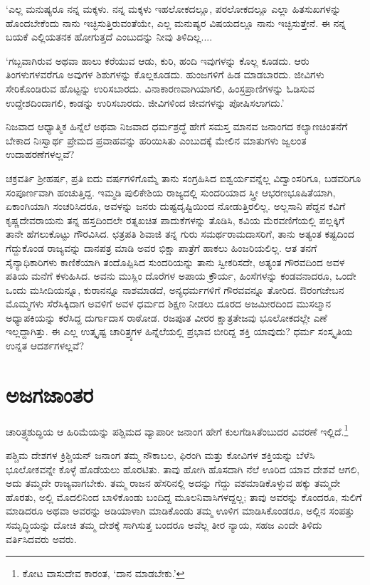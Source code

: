 \newpage

‘ಎಲ್ಲ ಮನುಷ್ಯರೂ ನನ್ನ ಮಕ್ಕಳು. ನನ್ನ ಮಕ್ಕಳು ಇಹಲೋಕದಲ್ಲೂ, ಪರಲೋಕದಲ್ಲೂ ಎಲ್ಲಾ ಹಿತಸುಖಗಳನ್ನು ಹೊಂದಬೇಕೆಂದು ನಾನು ಇಚ್ಛಿಸುತ್ತಿರುವಂತೆಯೇ, ಎಲ್ಲ ಮನುಷ್ಯರ ವಿಷಯದಲ್ಲೂ ನಾನು ಇಚ್ಛಿಸುತ್ತೇನೆ. ಈ ನನ್ನ ಬಯಕೆ ಎಲ್ಲಿಯತನಕ ಹೋಗುತ್ತದೆ ಎಂಬುದನ್ನು ನೀವು ತಿಳಿದಿಲ್ಲ....

‘ಗಬ್ಬವಾಗಿರುವ ಅಥವಾ ಹಾಲು ಕರೆಯುವ ಆಡು, ಕುರಿ, ಹಂದಿ ಇವುಗಳನ್ನು ಕೊಲ್ಲ ಕೂಡದು. ಆರು ತಿಂಗಳುಗಳವರೆಗೂ ಅವುಗಳ ಶಿಶುಗಳನ್ನು ಕೊಲ್ಲಕೂಡದು. ಹುಂಜಗಳಿಗೆ ಹಿಡ ಮಾಡಬಾರದು. ಜೀವಿಗಳು ಸೇರಿಕೊಂಡಿರುವ ಹೊಟ್ಟನ್ನು ಉರಿಸಬಾರದು. ವಿನಾಕಾರಣವಾಗಿಯಾಗಲಿ, ಹಿಂಸ್ರಪ್ರಾಣಿಗಳನ್ನು ಓಡಿಸುವ ಉದ್ದೇಶದಿಂದಾಗಲಿ, ಕಾಡನ್ನು ಉರಿಸಬಾರದು. ಜೀವಿಗಳಿಂದ ಜೀವಗಳನ್ನು ಪೋಷಿಸಲಾಗದು.’

ನಿಜವಾದ ಆಧ್ಯಾತ್ಮಿಕ ಹಿನ್ನೆಲೆ ಅಥವಾ ನಿಜವಾದ ಧರ್ಮಶ್ರದ್ಧೆ ಹೇಗೆ ಸಮಸ್ತ ಮಾನವ ಜನಾಂಗದ ಕಲ್ಯಾಣಚಿಂತನೆಗೆ ಬೇಕಾದ ನಿಃಸ್ವಾರ್ಥ ಪ್ರೇಮದ ಪ್ರವಾಹವನ್ನು ಹರಿಯಿಸಿತು ಎಂಬುದಕ್ಕೆ ಮೇಲಿನ ಮಾತುಗಳು ಜ್ವಲಂತ ಉದಾಹರಣೆಗಳಲ್ಲವೆ?

ಚಕ್ರವರ್ತಿ ಶ‍್ರೀಹರ್ಷ, ಪ್ರತಿ ಐದು ವರ್ಷಗಳಿಗೊಮ್ಮೆ ತಾನು ಸಂಗ್ರಹಿಸಿದ ಐಶ್ವರ್ಯವನ್ನೆಲ್ಲ ವಿದ್ವಾಂಸರಿಗೂ, ಬಡವರಿಗೂ ಸಂಪೂರ್ಣವಾಗಿ ಹಂಚುತ್ತಿದ್ದ. ಇಮ್ಮಡಿ ಪುಲಿಕೇಶಿಯ ರಾಜ್ಯದಲ್ಲಿ ಸುಂದರಿಯಾದ ಸ್ತ್ರೀ ಆಭರಣಭೂಷಿತೆಯಾಗಿ, ಏಕಾಂಗಿಯಾಗಿ ಸಂಚರಿಸಿದರೂ, ಅವಳನ್ನು ಜನರು ದುಷ್ಟದೃಷ್ಟಿಯಿಂದ ನೋಡುತ್ತಿರಲಿಲ್ಲ. ಅಲ್ಲಸಾನಿ ಪೆದ್ದನ ಕವಿಗೆ ಕೃಷ್ಣದೇವರಾಯನು ತನ್ನ ಹಸ್ತದಿಂದಲೇ ರತ್ನಖಚಿತ ಪಾದುಕೆಗಳನ್ನು ತೊಡಿಸಿ, ಕವಿಯ ಮೆರವಣಿಗೆಯಲ್ಲಿ ಪಲ್ಲಕ್ಕಿಗೆ ತಾನೇ ಹೆಗಲುಕೊಟ್ಟು ಗೌರವಿಸಿದ. ಛತ್ರಪತಿ ಶಿವಾಜಿ ತನ್ನ ಗುರು ಸಮರ್ಥರಾಮದಾಸರಿಗೆ, ತಾನು ಅತ್ಯಂತ ಕಷ್ಟದಿಂದ ಗೆದ್ದುಕೊಂಡ ರಾಜ್ಯವನ್ನು ದಾನಪತ್ರ ಮಾಡಿ ಅವರ ಭಿಕ್ಷಾ ಪಾತ್ರೆಗೆ ಹಾಕಲು ಹಿಂಜರಿಯಲಿಲ್ಲ. ಆತ ತನಗೆ ಸೈನ್ಯಾಧಿಕಾರಿಗಳು ಕಾಣಿಕೆಯಾಗಿ ತಂದೊಪ್ಪಿಸಿದ ಸುಂದರಿಯನ್ನು ತಾನು ಸ್ವೀಕರಿಸದೇ, ಅತ್ಯಂತ ಗೌರವದಿಂದ ಅವಳ ಪತಿಯ ಮನೆಗೆ ಕಳುಹಿಸಿದ. ಅವನು ಮುಸ್ಲಿಂ ದೊರೆಗಳ ಅಪಾಯ ಕ್ರೌರ್ಯ, ಹಿಂಸೆಗಳನ್ನು ಕಂಡವನಾದರೂ, ಒಂದೇ ಒಂದು ಮಸೀದಿಯನ್ನೂ, ಕುರಾನನ್ನೂ ನಾಶಮಾಡದೆ, ಅನ್ಯಧರ್ಮಗಳಿಗೆ ಗೌರವವನ್ನೂ ತೋರಿದ. ಔರಂಗಜೇಬನ ಮೊಮ್ಮಗಳು ಸೆರೆಸಿಕ್ಕಿದಾಗ ಅವಳಿಗೆ ಅವಳ ಧರ್ಮದ ಶಿಕ್ಷಣ ನೀಡಲು ದೂರದ ಅಜಮೀರದಿಂದ ಮುಸಲ್ಮಾನ ಅಧ್ಯಾಪಕಿಯನ್ನು ಕರೆಸಿದ್ದ ದುರ್ಗಾದಾಸ ರಾಠೋಡ. ರಜಪೂತ ವೀರರ ಕ್ಷಾತ್ರತೇಜವು ಭೂಲೋಕದಲ್ಲೇ ಎಣೆ ಇಲ್ಲದ್ದಾಗಿತ್ತು. ಈ ಎಲ್ಲ ಉತ್ಕೃಷ್ಟ ಚಾರಿತ್ರ್ಯಗಳ ಹಿನ್ನೆಲೆಯಲ್ಲಿ ಪ್ರಭಾವ ಬೀರಿದ್ದ ಶಕ್ತಿ ಯಾವುದು? ಧರ್ಮ ಸಂಸ್ಕೃತಿಯ ಉನ್ನತ ಆದರ್ಶಗಳಲ್ಲವೆ?


\section*{ಅಜಗಜಾಂತರ}


ಚಾರಿತ್ರ್ಯಶುದ್ಧಿಯ ಆ ಹಿರಿಮೆಯನ್ನು ಪಶ್ಚಿಮದ ವ್ಯಾಪಾರೀ ಜನಾಂಗ ಹೇಗೆ ಕುಲಗೆಡಿಸಿತೆಂಬುದರ ವಿವರಣೆ ಇಲ್ಲಿದೆ.\footnote{ಕೋಟ ವಾಸುದೇವ ಕಾರಂತ, ‘ದಾನ ಮಾಡಬೇಕು.’}

ಪಶ್ಚಿಮ ದೇಶಗಳ ಕ್ರಿಶ್ಚಿಯನ್​ ಜನಾಂಗ ತಮ್ಮ ನೌಕಾಬಲ, ಫಿರಂಗಿ ಮತ್ತು ಕೋವಿಗಳ ಶಕ್ತಿಯನ್ನು ಬೆಳೆಸಿ ಭೂಲೋಕವನ್ನೇ ಕೊಳ್ಳೆ ಹೊಡೆಯಲು ಹೊರಟಿತು. ತಾವು ಹೋಗಿ ಹೊಸದಾಗಿ ನೆಲೆ ಊರಿದ ಯಾವ ದೇಶವೆ ಆಗಲಿ, ಅದು ತಮ್ಮದೇ ರಾಜ್ಯವಾಗಬೇಕು. ತಮ್ಮ ರಾಜನ ಹೆಸರಿನಲ್ಲಿ ಅದನ್ನು ಗೆದ್ದು ವಶಮಾಡಿಕೊಳ್ಳುವ ಹಕ್ಕು ತಮ್ಮದೇ ಹೊರತು, ಅಲ್ಲಿ ಮೊದಲಿನಿಂದ ಬಾಳಿಕೊಂಡು ಬಂದಿದ್ದ ಮೂಲನಿವಾಸಿಗಳದ್ದಲ್ಲ; ತಾವು ಅವರನ್ನು ಕೊಂದರೂ, ಸುಲಿಗೆ ಮಾಡಿದರೂ ಅಥವಾ ಅವರನ್ನು ಅಡಿಯಾಳಾಗಿ ಮಾಡಿಕೊಂಡು ತಮ್ಮ ಊಳಿಗ ಮಾಡಿಸಿಕೊಂಡರೂ, ಅಲ್ಲಿನ ಸಂಪತ್ತು ಸಮೃದ್ಧಿಯನ್ನು ದೋಚಿ ತಮ್ಮ ದೇಶಕ್ಕೆ ಸಾಗಿಸುತ್ತ ಬಂದರೂ ಅವೆಲ್ಲ ತೀರ ನ್ಯಾಯ, ಸಹಜ ಎಂದೇ ತಿಳಿದು ವರ್ತಿಸಿದವರು ಅವರು.


